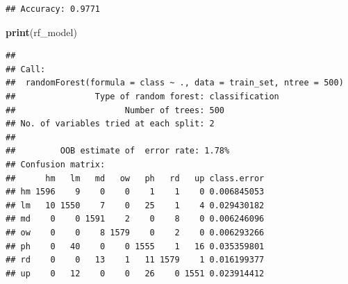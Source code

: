 \documentclass[
]{article}
\newenvironment{Shaded}{\begin{snugshade}}{\end{snugshade}}
\newcommand{\CommentTok}[1]{\textcolor[rgb]{0.56,0.35,0.01}{\textit{#1}}}
\newcommand{\FunctionTok}[1]{\textcolor[rgb]{0.13,0.29,0.53}{\textbf{#1}}}
\newcommand{\NormalTok}[1]{#1}
\newcommand{\SpecialCharTok}[1]{\textcolor[rgb]{0.81,0.36,0.00}{\textbf{#1}}}
\begin{document}
\begin{verbatim}
## Accuracy: 0.9771
\end{verbatim}

\begin{Shaded}
\begin{Highlighting}[]
\FunctionTok{print}\NormalTok{(rf\_model)}
\end{Highlighting}
\end{Shaded}

\begin{verbatim}
## 
## Call:
##  randomForest(formula = class ~ ., data = train_set, ntree = 500) 
##                Type of random forest: classification
##                      Number of trees: 500
## No. of variables tried at each split: 2
## 
##         OOB estimate of  error rate: 1.78%
## Confusion matrix:
##      hm   lm   md   ow   ph   rd   up class.error
## hm 1596    9    0    0    1    1    0 0.006845053
## lm   10 1550    7    0   25    1    4 0.029430182
## md    0    0 1591    2    0    8    0 0.006246096
## ow    0    0    8 1579    0    2    0 0.006293266
## ph    0   40    0    0 1555    1   16 0.035359801
## rd    0    0   13    1   11 1579    1 0.016199377
## up    0   12    0    0   26    0 1551 0.023914412
\end{verbatim}

\begin{Shaded}
\end{Shaded}
\end{document}
